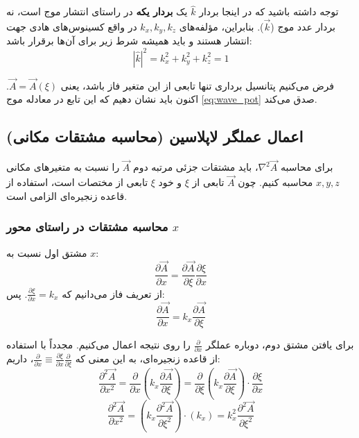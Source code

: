 \documentclass[12pt,a4paper]{article}
\begin{document}
\begin{tcolorbox}[colback=yellow!5,colframe=red!50!black,title=نکته بسیار مهم فیزیکی (تله ریاضی)]
توجه داشته باشید که در اینجا بردار $\hat{k}$ یک \textbf{بردار یکه } در راستای انتشار موج است، نه بردار عدد موج ($\vec{k}$). بنابراین، مؤلفه‌های $k_x, k_y, k_z$ در واقع کسینوس‌های هادی جهت انتشار هستند و باید همیشه شرط زیر برای آن‌ها برقرار باشد:
\begin{equation} \label{eq:unit_vec}
    |\hat{k}|^2 = k_x^2 + k_y^2 + k_z^2 = 1
\end{equation}
\end{tcolorbox}

فرض می‌کنیم پتانسیل برداری تنها تابعی از این متغیر فاز باشد، یعنی $\vec{A} = \vec{A}(\xi)$. اکنون باید نشان دهیم که این تابع در معادله موج \eqref{eq:wave_pot} صدق می‌کند.

\subsection{اعمال عملگر لاپلاسین (محاسبه مشتقات مکانی)}
برای محاسبه $\nabla^2 \vec{A}$، باید مشتقات جزئی مرتبه دوم $\vec{A}$ را نسبت به متغیرهای مکانی $x, y, z$ محاسبه کنیم. چون $\vec{A}$ تابعی از $\xi$ و خود $\xi$ تابعی از مختصات است، استفاده از قاعده زنجیره‌ای  الزامی است.

\subsubsection*{محاسبه مشتقات در راستای محور $x$}
مشتق اول نسبت به $x$:
\begin{equation}
    \frac{\partial \vec{A}}{\partial x} = \frac{\partial \vec{A}}{\partial \xi} \frac{\partial \xi}{\partial x}
\end{equation}
از تعریف فاز می‌دانیم که $\frac{\partial \xi}{\partial x} = k_x$. پس:
\begin{equation}
    \frac{\partial \vec{A}}{\partial x} = k_x \frac{\partial \vec{A}}{\partial \xi}
\end{equation}

برای یافتن مشتق دوم، دوباره عملگر $\frac{\partial}{\partial x}$ را روی نتیجه اعمال می‌کنیم. مجدداً با استفاده از قاعده زنجیره‌ای، به این معنی که $\frac{\partial}{\partial x} \equiv \frac{\partial \xi}{\partial x} \frac{\partial}{\partial \xi}$، داریم:
\begin{equation}
    \frac{\partial^2 \vec{A}}{\partial x^2} = \frac{\partial}{\partial x} \left( k_x \frac{\partial \vec{A}}{\partial \xi} \right) = \frac{\partial}{\partial \xi} \left( k_x \frac{\partial \vec{A}}{\partial \xi} \right) \cdot \frac{\partial \xi}{\partial x}
\end{equation}
\begin{equation}
    \frac{\partial^2 \vec{A}}{\partial x^2} = \left( k_x \frac{\partial^2 \vec{A}}{\partial \xi^2} \right) \cdot (k_x) = k_x^2 \frac{\partial^2 \vec{A}}{\partial \xi^2}
\end{equation}
\end{document}
